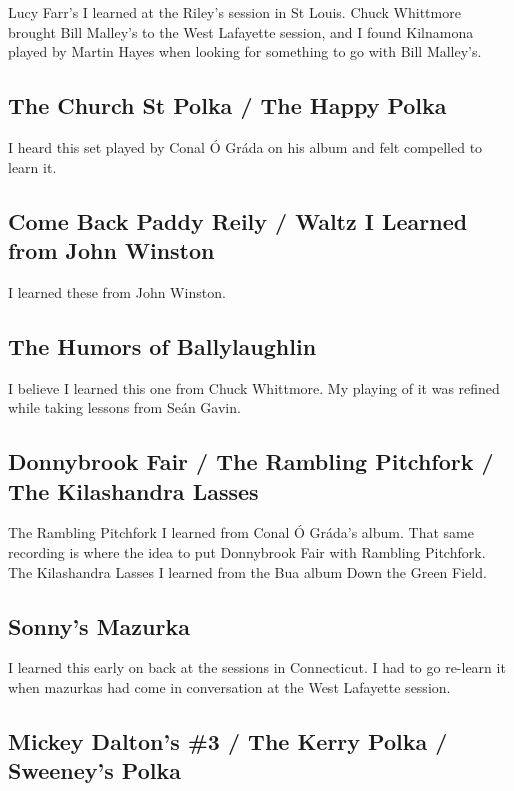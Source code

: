 \documentclass[11pt,letterpaper]{article}
\begin{document}
Lucy Farr's I learned at the Riley's session in St Louis. Chuck Whittmore brought Bill Malley's to the West Lafayette session, and I found Kilnamona played by Martin Hayes when looking for something to go with Bill Malley's.

\subsection*{The Church St Polka / The Happy Polka}

I heard this set played by Conal \'O Gr\'ada on his album and felt compelled to learn it. 

\subsection*{Come Back Paddy Reily / Waltz I Learned from John Winston}

I learned these from John Winston.

\subsection*{The Humors of Ballylaughlin}

I believe I learned this one from Chuck Whittmore. My playing of it was refined while taking lessons from Se\'an Gavin.

\subsection*{Donnybrook Fair / The Rambling Pitchfork / The Kilashandra Lasses}

The Rambling Pitchfork I learned from Conal \'O Gr\'ada's album. That same recording is where the idea to put Donnybrook Fair with Rambling Pitchfork. The Kilashandra Lasses I learned from the Bua album Down the Green Field.

\subsection*{Sonny's Mazurka}

I learned this early on back at the sessions in Connecticut. I had to go re-learn it when mazurkas had come in conversation at the West Lafayette session.

\subsection*{Mickey Dalton's \#3 / The Kerry Polka / Sweeney's Polka}
\end{document}
